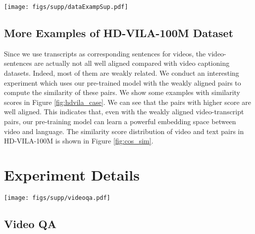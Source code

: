 \begin{figure*}
    \centering
    \texttt{[image: figs/supp/dataExampSup.pdf]}
    \caption{More examples of HD-VILA-100M with similarity scores calculated by HD-VILA. Relevant words are highlighted in red. [Best viewed in color.]}
    \label{fig:hdvila_case}
\end{figure*}

\subsection{More Examples of HD-VILA-100M Dataset}
Since we use transcripts as corresponding sentences for videos, the video-sentences are actually not all well aligned compared with video captioning datasets. Indeed, most of them are weakly related. We conduct an interesting experiment which uses our pre-trained model with the weakly aligned pairs to compute the similarity of these pairs. We show some examples with similarity scores in Figure \ref{fig:hdvila_case}. We can see that the pairs with higher score are well aligned. This indicates that, even with the weakly aligned video-transcript pairs, our pre-training model can learn a powerful embedding space between video and language.
The similarity score distribution of video and text pairs in HD-VILA-100M is shown in Figure \ref{fig:cos_sim}.

\section{Experiment Details}

\begin{figure*}
    \centering
    \texttt{[image: figs/supp/videoqa.pdf]}
    \caption{\textbf{Some examples for video QA task}. We take TGIF \textit{Action} for example to demonstrate our model's ability to learn temporal information from videos.}
    \label{fig:supp-qa}
\end{figure*}

\subsection{Video QA}
